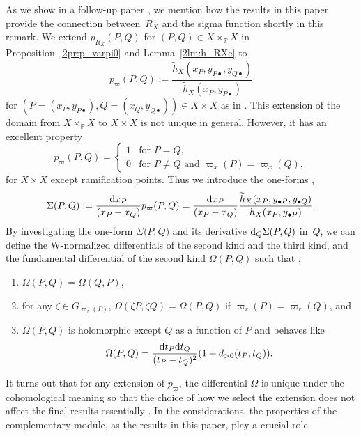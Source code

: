 \documentclass[pdftex]{sigma}
\def\PP{{\mathbb P}}
\def\th{{\widetilde h}}
\numberwithin{equation}{section}
\begin{document}
\begin{Remark}\label{rmk:Final}
As we show in a follow-up paper \cite{KMP2022b}, we mention how the results in this paper provide the connection between~$R_X$ and the sigma function shortly in this remark.
We extend $p_{R_X}(P,Q)$ for $(P,Q) \in X \times_\PP X$ in Proposition~\ref{2pr:p_varpi0} and Lemma~\ref{2lm:h_RXe} to
\[
p_{\varpi}(P,Q)
:=\frac{\th_X(x_P, y_{P\bullet}, y_{Q\bullet})}
{\th_X(x_P, y_{P\bullet})}
\]
for $(P=(x_P, y_{P\bullet}),Q=(x_Q, y_{Q\bullet})) \in X \times X$ as in \cite[Definition~12]{KMP2022b}.
This extension of the domain from $X \times_\PP X$ to $X \times X$ is not unique in general.
However, it has an excellent property
\[
p_{\varpi}(P,Q)
=
\begin{cases}
1 & \text{for } P = Q,\\
0 & \text{for } P \neq Q \text{ and }
 \varpi_x(P)=\varpi_x(Q),
\end{cases}
\]
for $X \times X$ except ramification points. Thus we introduce the one-forms \cite[Proposition~15]{KMP2022b},
\begin{equation*}
 \Sigma (P, Q )
 :=
\frac{{\rm d} x_P}{(x_P - x_Q)}p_{\varpi}(P,Q)
=
\frac{{\rm d} x_P}{(x_P - x_Q)}
\frac{\th_X(x_P, y_{\bullet P}, y_{\bullet Q})}
{h_X(x_P, y_{\bullet P})}.%
\end{equation*}
By investigating the one-form $\Sigma\big(P, Q\big)$ and its derivative ${\rm d}_Q\Sigma (P, Q )$ in~$Q$, we can define the W-normalized differentials of the second kind and the third kind, and the fundamental differential of the second kind $\Omega(P, Q)$ such that \cite[Theorem~3]{KMP2022b},
\begin{enumerate}\itemsep=0pt
\item[(1)] $\Omega(P, Q)=\Omega(Q, P)$,
\item[(2)] for any $\zeta \in G_{\varpi_r(P)}$,
$\Omega(\zeta P, \zeta Q)=\Omega(P, Q)$ if $\varpi_r(P)=\varpi_r(Q)$, and
\item[(3)]
 $\Omega(P, Q)$ is holomorphic except $Q$ as a function of $P$ and behaves like
\[
\Omega(P, Q)=\frac{{\rm d} t_P {\rm d} t_Q}{(t_P-t_Q)^2}(1 + d_{>0}(t_P, t_Q)).
\]
\end{enumerate}
It turns out that for any extension of $p_\varpi$, the differential $\Omega$ is unique under the cohomological meaning so that the choice of how we select the extension does not affect the final results essentially \cite[Proposition~16]{KMP2022b}.
In the considerations, the properties of the complementary module, as the results in this paper, play a crucial role.

\end{Remark}
\end{document}
